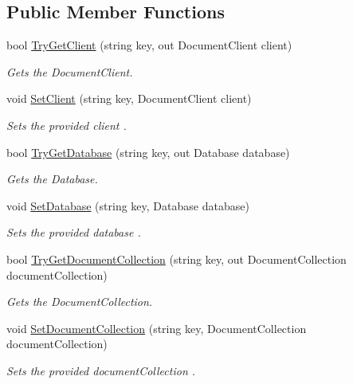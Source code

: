 \subsection*{Public Member Functions}
\begin{DoxyCompactItemize}
\item 
bool \hyperlink{interfaceCqrs_1_1Azure_1_1DocumentDb_1_1IAzureDocumentDbConnectionCache_a56a01a4224cb64d9349913e5237cebda_a56a01a4224cb64d9349913e5237cebda}{Try\+Get\+Client} (string key, out Document\+Client client)
\begin{DoxyCompactList}\small\item\em Gets the Document\+Client. \end{DoxyCompactList}\item 
void \hyperlink{interfaceCqrs_1_1Azure_1_1DocumentDb_1_1IAzureDocumentDbConnectionCache_a38d813e12b632a93a2934e2b1252f409_a38d813e12b632a93a2934e2b1252f409}{Set\+Client} (string key, Document\+Client client)
\begin{DoxyCompactList}\small\item\em Sets the provided {\itshape client} . \end{DoxyCompactList}\item 
bool \hyperlink{interfaceCqrs_1_1Azure_1_1DocumentDb_1_1IAzureDocumentDbConnectionCache_ac2ab3e4a1c093f10d0b55634d4990ab2_ac2ab3e4a1c093f10d0b55634d4990ab2}{Try\+Get\+Database} (string key, out Database database)
\begin{DoxyCompactList}\small\item\em Gets the Database. \end{DoxyCompactList}\item 
void \hyperlink{interfaceCqrs_1_1Azure_1_1DocumentDb_1_1IAzureDocumentDbConnectionCache_a9242c99ffb76f8ad9b15cab617056bf0_a9242c99ffb76f8ad9b15cab617056bf0}{Set\+Database} (string key, Database database)
\begin{DoxyCompactList}\small\item\em Sets the provided {\itshape database} . \end{DoxyCompactList}\item 
bool \hyperlink{interfaceCqrs_1_1Azure_1_1DocumentDb_1_1IAzureDocumentDbConnectionCache_af74bf6c8dc009e0179edc20ef3158f03_af74bf6c8dc009e0179edc20ef3158f03}{Try\+Get\+Document\+Collection} (string key, out Document\+Collection document\+Collection)
\begin{DoxyCompactList}\small\item\em Gets the Document\+Collection. \end{DoxyCompactList}\item 
void \hyperlink{interfaceCqrs_1_1Azure_1_1DocumentDb_1_1IAzureDocumentDbConnectionCache_a6f5dab93f2ebee2503eb808b9031777d_a6f5dab93f2ebee2503eb808b9031777d}{Set\+Document\+Collection} (string key, Document\+Collection document\+Collection)
\begin{DoxyCompactList}\small\item\em Sets the provided {\itshape document\+Collection} . \end{DoxyCompactList}\end{DoxyCompactItemize}


